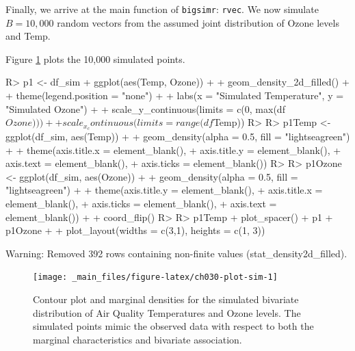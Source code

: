 \documentclass[
]{jss}
\begin{document}
Finally, we arrive at the main function of \texttt{bigsimr}: \texttt{rvec}. We now simulate \(B=10,000\) random vectors from the assumed joint distribution of Ozone levels and Temp.

\begin{CodeChunk}
\end{CodeChunk}

Figure \ref{fig:ch030-plot-sim} plots the 10,000 simulated points.

\begin{CodeChunk}
\begin{CodeInput}
R> p1 <- df_sim %
+   ggplot(aes(Temp, Ozone)) +
+   geom_density_2d_filled() +
+   theme(legend.position = "none") +
+   labs(x = "Simulated Temperature", y = "Simulated Ozone") +
+   scale_y_continuous(limits = c(0, max(df$Ozone))) +
+   scale_x_continuous(limits = range(df$Temp))
R> 
R> p1Temp <- ggplot(df_sim, aes(Temp)) + 
+   geom_density(alpha = 0.5, fill = "lightseagreen") +
+   theme(axis.title.x = element_blank(),
+         axis.title.y = element_blank(),
+         axis.text = element_blank(),
+         axis.ticks = element_blank())
R> 
R> p1Ozone <- ggplot(df_sim, aes(Ozone)) + 
+   geom_density(alpha = 0.5, fill = "lightseagreen") + 
+   theme(axis.title.y = element_blank(),
+         axis.title.x = element_blank(),
+         axis.ticks = element_blank(),
+         axis.text = element_blank()) +
+   coord_flip() 
R> 
R> p1Temp + plot_spacer() + p1 + p1Ozone + 
+   plot_layout(widths = c(3,1), heights = c(1, 3))
\end{CodeInput}
\begin{CodeOutput}
Warning: Removed 392 rows containing non-finite values (stat_density2d_filled).
\end{CodeOutput}
\begin{figure}

{\centering \texttt{[image: \_main\_files/figure-latex/ch030-plot-sim-1]} 

}

\caption[Contour plot and marginal densities for the simulated bivariate distribution of Air Quality Temperatures and Ozone levels]{Contour plot and marginal densities for the simulated bivariate distribution of Air Quality Temperatures and Ozone levels. The simulated points mimic the observed data with respect to both the marginal characteristics and bivariate association.}\label{fig:ch030-plot-sim}
\end{figure}
\end{CodeChunk}
\end{document}
